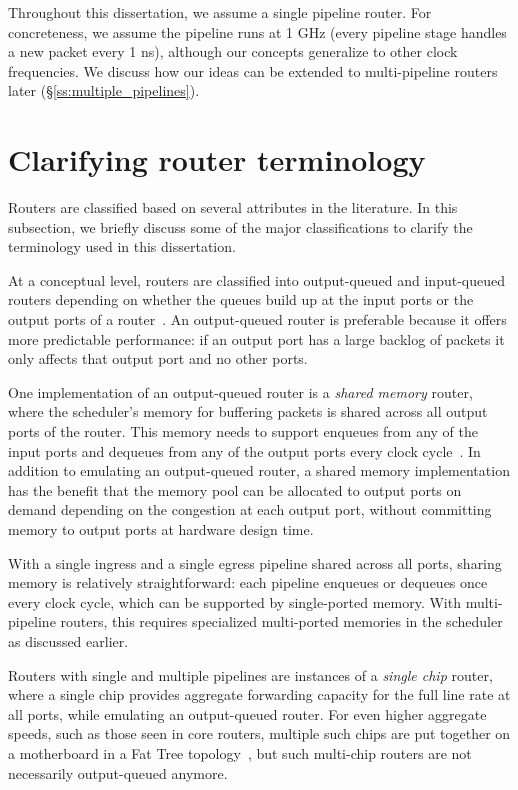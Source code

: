Throughout this dissertation, we assume a single pipeline router. For
concreteness, we assume the pipeline runs at 1 GHz (\ie every pipeline stage
handles a new packet every 1 ns), although our concepts generalize to other
clock frequencies. We discuss how our ideas can be extended to multi-pipeline
routers later (\S\ref{ss:multiple_pipelines}).

\section{Clarifying router terminology}

Routers are classified based on several attributes in the literature. In this
subsection, we briefly discuss some of the major classifications to clarify the
terminology used in this dissertation.

At a conceptual level, routers are classified into output-queued and
input-queued routers depending on whether the queues build up at the input
ports or the output ports of a router~\cite{karol}. An output-queued router is
preferable because it offers more predictable performance: if an output port
has a large backlog of packets it only affects that output port and no other
ports.

One implementation of an output-queued router is a {\em shared memory} router,
where the scheduler's memory for buffering packets is shared across all output
ports of the router. This memory needs to support enqueues from any of the
input ports and dequeues from any of the output ports every clock
cycle~\cite{sundar_shared_memory, dctcp}.  In addition to emulating an
output-queued router, a shared memory implementation has the benefit that the
memory pool can be allocated to output ports on demand depending on the
congestion at each output port, without committing memory to output ports at
hardware design time.

With a single ingress and a single egress pipeline shared across all ports,
sharing memory is relatively straightforward: each pipeline enqueues or
dequeues once every clock cycle, which can be supported by single-ported
memory. With multi-pipeline routers, this requires specialized multi-ported
memories in the scheduler as discussed earlier. 

Routers with single and multiple pipelines are instances of a {\em single chip}
router, where a single chip provides aggregate forwarding capacity for the full
line rate at all ports, while emulating an output-queued router. For even
higher aggregate speeds, such as those seen in core routers, multiple such
chips are put together on a motherboard in a Fat Tree topology~\cite{b4}, but
such multi-chip routers are not necessarily output-queued anymore.

